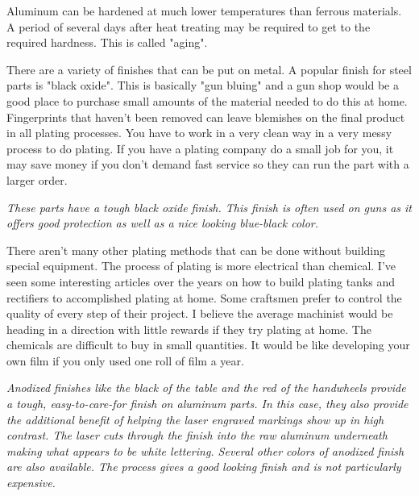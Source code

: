 
Aluminum can be hardened at much lower temperatures than ferrous materials. A
period of several days after heat treating may be required to get to the
required hardness. This is called "aging".

\secup

\secdown


There are a variety of finishes that can be put on metal. A popular finish for
steel parts is "black oxide". This is basically "gun bluing" and a gun shop
would be a good place to purchase small amounts of the material needed to do
this at home. Fingerprints that haven't been removed can leave blemishes on the
final product in all plating processes. You have to work in a very clean way in
a very messy process to do plating. If you have a plating company do a small job
for you, it may save money if you don't demand fast service so they can run the
part with a larger order.

\bigskip
\textit{These parts have a tough black oxide finish. This finish is often used
on guns as it offers good protection as well as a nice looking blue-black
color.}
\bigskip


There aren't many other plating methods that can be done without building
special equipment. The process of plating is more electrical than chemical. I've
seen some interesting articles over the years on how to build plating tanks and
rectifiers to accomplished plating at home. Some craftsmen prefer to control the
quality of every step of their project. I believe the average machinist would be
heading in a direction with little rewards if they try plating at home. The
chemicals are difficult to buy in small quantities. It would be like developing
your own film if you only used one roll of film a year.

\bigskip
\textit{Anodized finishes like the black of the table and the red of the
handwheels provide a tough, easy-to-care-for finish on aluminum parts. In this
case, they also provide the additional benefit of helping the laser engraved
markings show up in high contrast. The laser cuts through the finish into the
raw aluminum underneath making what appears to be white lettering. Several other
colors of anodized finish are also available. The process gives a good looking
finish and is not particularly expensive.}
\bigskip

